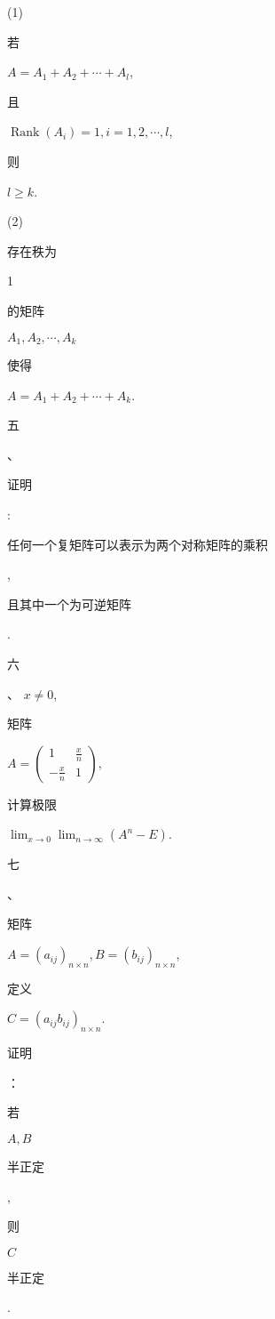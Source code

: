 \documentclass[10pt]{article}
\begin{document}
(1) \begin{CJK}{UTF8}{mj}若\end{CJK} $A=A_{1}+A_{2}+\cdots+A_{l}$, \begin{CJK}{UTF8}{mj}且\end{CJK} $\operatorname{Rank}\left(A_{i}\right)=1, i=1,2, \cdots, l$, \begin{CJK}{UTF8}{mj}则\end{CJK} $l \geq k$.

(2) \begin{CJK}{UTF8}{mj}存在秩为\end{CJK} 1 \begin{CJK}{UTF8}{mj}的矩阵\end{CJK} $A_{1}, A_{2}, \cdots, A_{k}$ \begin{CJK}{UTF8}{mj}使得\end{CJK} $A=A_{1}+A_{2}+\cdots+A_{k}$.

\begin{CJK}{UTF8}{mj}五\end{CJK}、\begin{CJK}{UTF8}{mj}证明\end{CJK}: \begin{CJK}{UTF8}{mj}任何一个复矩阵可以表示为两个对称矩阵的乘积\end{CJK}, \begin{CJK}{UTF8}{mj}且其中一个为可逆矩阵\end{CJK}.

\begin{CJK}{UTF8}{mj}六\end{CJK}、 $x \neq 0$, \begin{CJK}{UTF8}{mj}矩阵\end{CJK} $A=\left(\begin{array}{cc}1 & \frac{x}{n} \\ -\frac{x}{n} & 1\end{array}\right)$, \begin{CJK}{UTF8}{mj}计算极限\end{CJK} $\lim _{x \rightarrow 0} \lim _{n \rightarrow \infty}\left(A^{n}-E\right)$.

\begin{CJK}{UTF8}{mj}七\end{CJK}、\begin{CJK}{UTF8}{mj}矩阵\end{CJK} $A=\left(a_{i j}\right)_{n \times n}, B=\left(b_{i j}\right)_{n \times n}$, \begin{CJK}{UTF8}{mj}定义\end{CJK} $C=\left(a_{i j} b_{i j}\right)_{n \times n}$. \begin{CJK}{UTF8}{mj}证明\end{CJK}：\begin{CJK}{UTF8}{mj}若\end{CJK} $A, B$ \begin{CJK}{UTF8}{mj}半正定\end{CJK}, \begin{CJK}{UTF8}{mj}则\end{CJK} $C$ \begin{CJK}{UTF8}{mj}半正定\end{CJK}.
\end{document}
